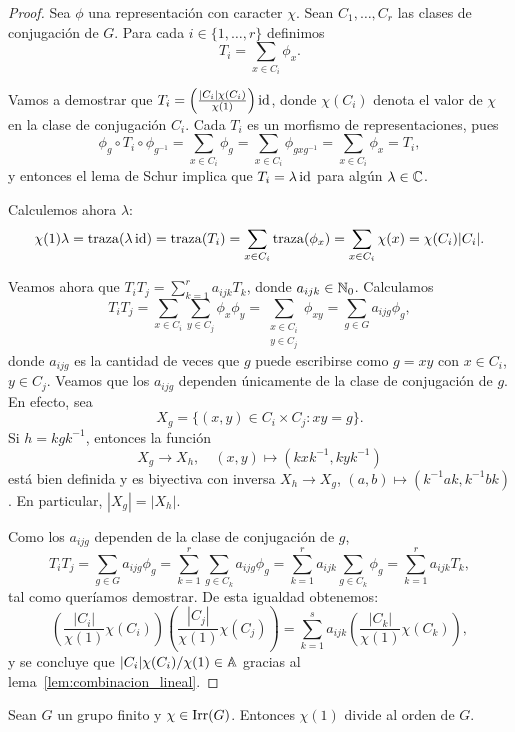 \begin{proof}
  Sea $\phi$ una representación con caracter $\chi$.  Sean $C_1,\dots,C_r$ las
  clases de conjugación de $G$. Para cada $i\in\{1,\dots,r\}$ 
  definimos 
  \[
    T_i=\sum_{x\in C_i}\phi_x.
  \]

  Vamos a demostrar que $T_i=\left(\frac{|C_i|\chi(C_i)}{\chi(1)}\right)\operatorname{id}$,
  donde $\chi(C_i)$ denota el valor de $\chi$ en la clase de conjugación $C_i$. 
  Cada $T_i$
  es un morfismo de representaciones, pues 
  \[
    \phi_g\circ T_i\circ \phi_{g^{-1}}
	=\sum_{x\in C_i}\phi_g
	=\sum_{x\in C_i}\phi_{gxg^{-1}}
	=\sum_{x\in C_i}\phi_x
	=T_i,
  \]
  y entonces el lema de Schur implica que $T_i=\lambda\operatorname{id}$ para algún
  $\lambda\in\mathbb{C}$. 
  
  Calculemos ahora $\lambda$:
  \[
    \chi(1)\lambda 
	=\operatorname{traza}(\lambda\operatorname{id})
	=\operatorname{traza}(T_i)
	=\sum_{x\in C_i}\operatorname{traza}(\phi_x)
	=\sum_{x\in C_i}\chi(x)
	=\chi(C_i)|C_i|.
  \]


  Veamos ahora que $T_iT_j=\sum_{k=1}^r a_{ijk}T_k$, donde $a_{ijk}\in\mathbb{N}_0$.
  Calculamos
  \[
	T_iT_j=\sum_{x\in C_i}\sum_{y\in C_j}\phi_x\phi_y=\sum_{\substack{x\in C_i\\y\in C_j}}\phi_{xy}=\sum_{g\in G}a_{ijg}\phi_g,
  \]
  donde $a_{ijg}$ es la cantidad de veces que $g$ puede escribirse como $g=xy$
  con $x\in C_i$, $y\in C_j$. 
  Veamos que los $a_{ijg}$ dependen únicamente de la clase de conjugación de
  $g$. En efecto, sea 
  \[
    X_g=\{(x,y)\in C_i\times C_j:xy=g\}.
  \]
  Si $h=kgk^{-1}$, entonces la función 
  \[
	 X_g\to X_h, \quad(x,y)\mapsto
  (kxk^{-1},kyk^{-1}) 
   \]
   está bien definida y es biyectiva con inversa $X_h\to
  X_g$, $(a,b)\mapsto (k^{-1}ak,k^{-1}bk)$. En particular, $|X_g|=|X_h|$. 

  Como los $a_{ijg}$ dependen de la clase de conjugación de $g$,
  \[
	T_iT_j=\sum_{g\in G}a_{ijg}\phi_g
	=\sum_{k=1}^r\sum_{g\in C_k}a_{ijg}\phi_g
	=\sum_{k=1}^ra_{ijk}\sum_{g\in C_k}\phi_g
	=\sum_{k=1}^ra_{ijk}T_k,
  \]
  tal como queríamos demostrar. De esta igualdad obtenemos:
  \begin{equation}
  \label{eq:omega}
    \left(\frac{|C_i|}{\chi(1)}\chi(C_i)\right)
    \left(\frac{|C_j|}{\chi(1)}\chi(C_j)\right)
    =\sum_{k=1}^sa_{ijk}\left(\frac{|C_k|}{\chi(1)}\chi(C_k)\right),
  \end{equation}
  y se concluye que $|C_i|\chi(C_i)/\chi(1)\in\mathbb{A}$ gracias al
  lema~\ref{lem:combinacion_lineal}.
\end{proof}

\begin{theorem}[Frobenius]
  \label{theorem:chi(1)||G|}
  Sean $G$ un grupo finito y $\chi\in\operatorname{Irr}(G)$. Entonces $\chi(1)$ divide al
  orden de $G$.
\end{theorem}

